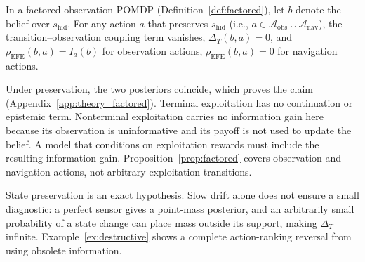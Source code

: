 \begin{proposition}
\label{prop:factored}
In a factored observation POMDP (Definition~\ref{def:factored}), let $b$ denote the belief over $s_{\mathrm{hid}}$. For any action $a$ that preserves $s_{\mathrm{hid}}$ (i.e., $a \in \mathcal{A}_{\mathrm{obs}} \cup \mathcal{A}_{\mathrm{nav}}$), the transition--observation coupling term vanishes, $\Delta_T(b, a) = 0$, and $\rho_{\mathrm{EFE}}(b, a) = I_a(b)$ for observation actions, $\rho_{\mathrm{EFE}}(b, a) = 0$ for navigation actions.
\end{proposition}

Under preservation, the two posteriors coincide, which proves the claim (Appendix~\ref{app:theory_factored}). Terminal exploitation has no continuation or epistemic term. Nonterminal exploitation carries no information gain here because its observation is uninformative and its payoff is not used to update the belief. A model that conditions on exploitation rewards must include the resulting information gain. Proposition~\ref{prop:factored} covers observation and navigation actions, not arbitrary exploitation transitions.

State preservation is an exact hypothesis. Slow drift alone does not ensure a small diagnostic: a perfect sensor gives a point-mass posterior, and an arbitrarily small probability of a state change can place mass outside its support, making $\Delta_T$ infinite. Example~\ref{ex:destructive} shows a complete action-ranking reversal from using obsolete information.

